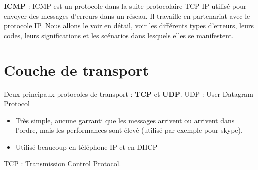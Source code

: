 \documentclass[a4paper,9pt, twocolumn]{article}
\begin{document}
	\textbf{ICMP} : ICMP est un protocole dans la suite protocolaire TCP-IP utilisé pour envoyer des messages d'erreurs dans un réseau.
	Il travaille en partenariat avec le protocole IP.
	Nous allons le voir en détail, voir les différents types d'erreurs, leurs codes, leurs significations et les scénarios dans lesquels elles se manifestent.


\section*{Couche de transport}

	Deux principaux protocoles de transport : \textbf{TCP} et \textbf{UDP}.
	UDP : User Datagram Protocol 
	\begin{itemize}
		\item Très simple, aucune garranti que les messages arrivent ou arrivent dans l'ordre, mais les performances sont élevé (utilisé par exemple pour skype), 
		\item Utilisé beaucoup en téléphone IP et en DHCP
	\end{itemize}
	
	TCP : Transmission Control Protocol.
	
\end{document}
